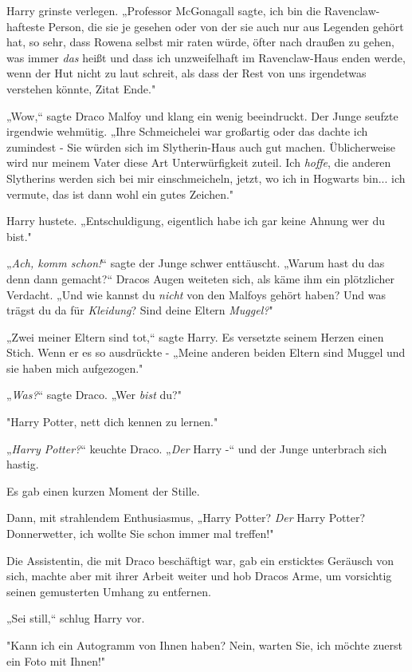 {Harry grinste verlegen. „Professor McGonagall sagte, ich bin die Ravenclaw-hafteste Person, die sie je gesehen oder von der sie auch nur aus Legenden gehört hat, so sehr, dass Rowena selbst mir raten würde, öfter nach draußen zu gehen, was immer \emph{das} heißt und dass ich unzweifelhaft im Ravenclaw-Haus enden werde, wenn der Hut nicht zu laut schreit, als dass der Rest von uns irgendetwas verstehen könnte, Zitat Ende."

„Wow,“ sagte Draco Malfoy und klang ein wenig beeindruckt. Der Junge seufzte irgendwie wehmütig. „Ihre Schmeichelei war großartig oder das dachte ich zumindest - Sie würden sich im Slytherin-Haus auch gut machen. Üblicherweise wird nur meinem Vater diese Art Unterwürfigkeit zuteil. Ich \emph{hoffe}, die anderen Slytherins werden sich bei mir einschmeicheln, jetzt, wo ich in Hogwarts bin... ich vermute, das ist dann wohl ein gutes Zeichen."

Harry hustete. „Entschuldigung, eigentlich habe ich gar keine Ahnung wer du bist."

„\emph{Ach, komm schon!}“ sagte der Junge schwer enttäuscht. „Warum hast du das denn dann gemacht?“ Dracos Augen weiteten sich, als käme ihm ein plötzlicher Verdacht. „Und wie kannst du \emph{nicht} von den Malfoys gehört haben? Und was trägst du da für \emph{Kleidung}? Sind deine Eltern \emph{Muggel?}"

„Zwei meiner Eltern sind tot,“ sagte Harry. Es versetzte seinem Herzen einen Stich. Wenn er es so ausdrückte - „Meine anderen beiden Eltern sind Muggel und sie haben mich aufgezogen."

„\emph{Was?}“ sagte Draco. „Wer \emph{bist} du?"

"Harry Potter, nett dich kennen zu lernen."

„\emph{Harry Potter?}“ keuchte Draco. „\emph{Der} Harry -“ und der Junge unterbrach sich hastig.

Es gab einen kurzen Moment der Stille.

Dann, mit strahlendem Enthusiasmus, „Harry Potter? \emph{Der} Harry Potter? Donnerwetter, ich wollte Sie schon immer mal treffen!"

Die Assistentin, die mit Draco beschäftigt war, gab ein ersticktes Geräusch von sich, machte aber mit ihrer Arbeit weiter und hob Dracos Arme, um vorsichtig seinen gemusterten Umhang zu entfernen.

„Sei still,“ schlug Harry vor.

"Kann ich ein Autogramm von Ihnen haben? Nein, warten Sie, ich möchte zuerst ein Foto mit Ihnen!"

}
